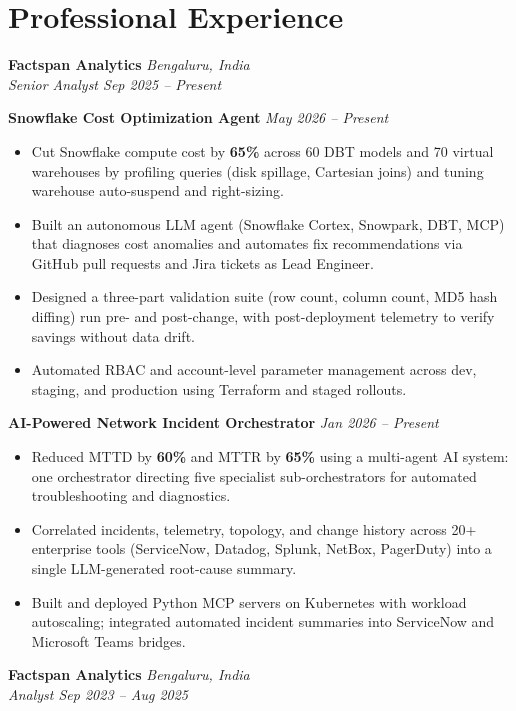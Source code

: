 \documentclass[10pt,a4paper]{article}
\newcommand{\role}[3]{\textbf{#1} \hfill \textit{#2}\\[-1pt] \textit{#3}}
\newcommand{\proj}[2]{\vspace{2pt}\textbf{#1} \hfill \textit{#2}\par\vspace{-1pt}}
\begin{document}
\section*{Professional Experience}
\role{Factspan Analytics}{Bengaluru, India}{Senior Analyst \hfill Sep 2025 -- Present}

\proj{Snowflake Cost Optimization Agent}{May 2026 -- Present}
\begin{itemize}
\item Cut Snowflake compute cost by \textbf{65\%} across 60 DBT models and 70 virtual warehouses by profiling queries (disk spillage, Cartesian joins) and tuning warehouse auto-suspend and right-sizing.
\item Built an autonomous LLM agent (Snowflake Cortex, Snowpark, DBT, MCP) that diagnoses cost anomalies and automates fix recommendations via GitHub pull requests and Jira tickets as Lead Engineer.
\item Designed a three-part validation suite (row count, column count, MD5 hash diffing) run pre- and post-change, with post-deployment telemetry to verify savings without data drift.
\item Automated RBAC and account-level parameter management across dev, staging, and production using Terraform and staged rollouts.
\end{itemize}

\proj{AI-Powered Network Incident Orchestrator}{Jan 2026 -- Present}
\begin{itemize}
\item Reduced MTTD by \textbf{60\%} and MTTR by \textbf{65\%} using a multi-agent AI system: one orchestrator directing five specialist sub-orchestrators for automated troubleshooting and diagnostics.
\item Correlated incidents, telemetry, topology, and change history across 20+ enterprise tools (ServiceNow, Datadog, Splunk, NetBox, PagerDuty) into a single LLM-generated root-cause summary.
\item Built and deployed Python MCP servers on Kubernetes with workload autoscaling; integrated automated incident summaries into ServiceNow and Microsoft Teams bridges.
\end{itemize}

\vspace{3pt}
\role{Factspan Analytics}{Bengaluru, India}{Analyst \hfill Sep 2023 -- Aug 2025}
\end{document}
